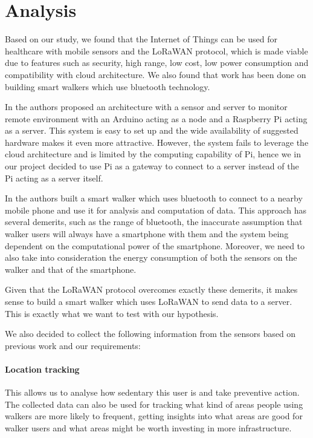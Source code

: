 \chapter{Analysis}
\label{cha:analysis}

Based on our study, we found that the Internet of Things can be used for healthcare with mobile sensors and the LoRaWAN protocol, which is made viable due to features such as security, high range, low cost, low power consumption and compatibility with cloud architecture. We also found that work has been done on building smart walkers which use bluetooth technology.

In \cite{ferdoush2014wireless} the authors proposed an architecture with a sensor and server to monitor remote environment with an Arduino acting as a node and a Raspberry Pi acting as a server. This system is easy to set up and the wide availability of suggested hardware makes it even more attractive. However, the system fails to leverage the cloud architecture and is limited by the computing capability of Pi, hence we in our project decided to use Pi as a gateway to connect to a server instead of the Pi acting as a server itself.


In \cite{postolache2011smart} the authors built a smart walker which uses bluetooth to connect to a nearby mobile phone and use it for analysis and computation of data. This approach has several demerits, such as the range of bluetooth, the inaccurate assumption that walker users will always have a smartphone with them and the system being dependent on the computational power of the smartphone. Moreover, we need to also take into consideration the energy consumption of both the sensors on the walker and that of the smartphone.

Given that the LoRaWAN protocol overcomes exactly these demerits, it makes sense to build a smart walker which uses LoRaWAN to send data to a server.
This is exactly what we want to test with our hypothesis.

We also decided to collect the following information from the sensors based on previous work \cite{postolache2011smart} and our requirements: 

\subsubsection{Location tracking}
This allows us to analyse how sedentary this user is and take preventive action. The collected data can also be used for tracking what kind of areas people using walkers are more likely to frequent, getting insights into what areas are good for walker users and what areas might be worth investing in more infrastructure.

